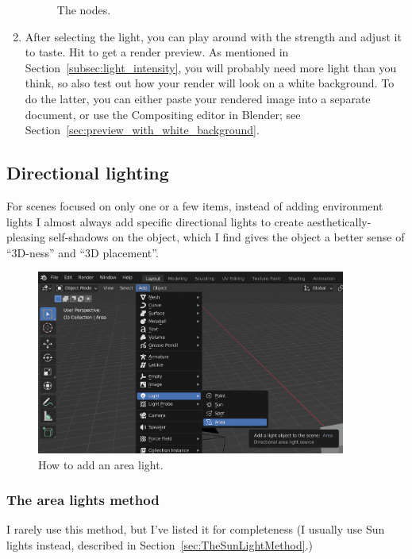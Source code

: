 \documentclass[10pt]{article}
\begin{document}
\begin{enumerate}
\begin{figure}[H]
    \caption{The nodes.}
    \label{fig:world-lighting-nodes}
\end{figure}
\item After selecting the light, you can play around with the strength and adjust it to taste. Hit  to get a render preview. As mentioned in Section~\ref{subsec:light_intensity}, you will probably need more light than you think, so also test out how your render will look on a white background. To do the latter, you can either paste your rendered image into a separate document, or use the Compositing editor in Blender; see Section~\ref{sec:preview_with_white_background}.
\end{enumerate}

\subsection{Directional lighting}
\label{sec:DirectionalLighting}

For scenes focused on only one or a few items, instead of adding environment lights I almost always add specific directional lights to create aesthetically-pleasing self-shadows on the object, which I find gives the object a better sense of ``3D-ness'' and ``3D placement''. 
\begin{figure}[H]
    \centering
    \captionsetup{width=0.8\textwidth}
    \includegraphics[width=4in]{images/adding-area-light.png}
    \caption{How to add an area light.}
\end{figure}

\subsubsection{The area lights method}
I rarely use this method, but I've listed it for completeness (I usually use Sun lights instead, described in Section~\ref{sec:TheSunLightMethod}.) 
\end{document}
